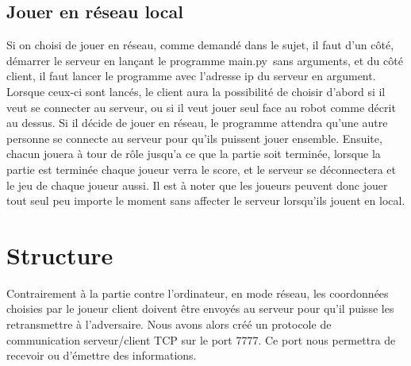 \documentclass{article}
\begin{document}
	 \subsection{Jouer en r\'eseau local}
	 Si on choisi de jouer en r\'eseau, comme demand\'e dans le sujet, il faut d’un c\^ot\'e, d\'emarrer le serveur en lan\c cant le programme \guillemotleft main.py\guillemotright \ sans arguments, et du c\^ot\'e client, il faut lancer le programme avec l’adresse ip du serveur en argument.
	 \newline Lorsque ceux-ci sont lanc\'es, le client aura la possibilit\'e de choisir d\textquoteright abord si il veut se connecter au serveur, ou si il veut jouer seul face au robot comme d\'ecrit au dessus. Si il d\'ecide de jouer en r\'eseau, le programme attendra qu\textquoteright une autre personne se connecte au serveur pour qu'ils puissent jouer ensemble.
	 \newline Ensuite, chacun jouera \`a tour de r\^ole jusqu\textquoteright a ce que la partie soit termin\'ee, lorsque la partie est termin\'ee chaque joueur verra le score, et le serveur se d\'econnectera et le jeu de chaque joueur aussi. 
	 \newline Il est \`a noter que les joueurs peuvent donc jouer tout seul peu importe le moment sans affecter le serveur lorsqu\textquoteright ils jouent en local.

\section{Structure}
	Contrairement \`a la partie contre l'ordinateur, en mode r\'eseau, les coordonn\'ees choisies par le joueur client doivent \^etre envoy\'es au serveur pour qu\textquoteright il puisse les retransmettre \`a l'adversaire. Nous avons alors cr\'e\'e un protocole de communication serveur/client TCP sur le port 7777. Ce port nous permettra de recevoir ou d'\'emettre des informations.
\end{document}
